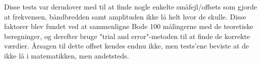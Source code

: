 Disse tests var derudover med til at finde nogle enkelte småfejl/offsets som gjorde at frekvensen, båndbredden samt amplituden ikke lå helt hvor de skulle. Disse faktorer blev fundet ved at sammenligne Bode 100 målingerne med de teoretiske beregninger, og derefter bruge "trial and error"-metoden til at finde de korrekte værdier. Årsagen til dette offset kendes endnu ikke, men tests'ene beviste at de ikke lå i matematikken, men andetsteds. 













